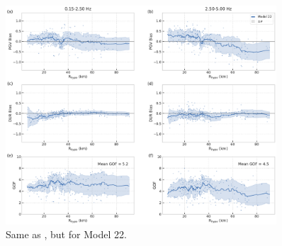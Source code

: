 \begin{figure}[!ht]
  \centering
  \includegraphics[width=0.9\textwidth,height=0.9\textheight,keepaspectratio]{figures/figure_highf_S32.pdf}
  \caption{Same as , but for Model 22.
  }
\label{fig:highf-S32}
\end{figure}
\clearpage




\renewcommand{\thesection}{\arabic{chapter}.\arabic{section}}
\renewcommand{\thesubsection}{\thesection.\arabic{subsection}}
\renewcommand{\thetable}{\arabic{table}}
\renewcommand{\thefigure}{\arabic{figure}}










